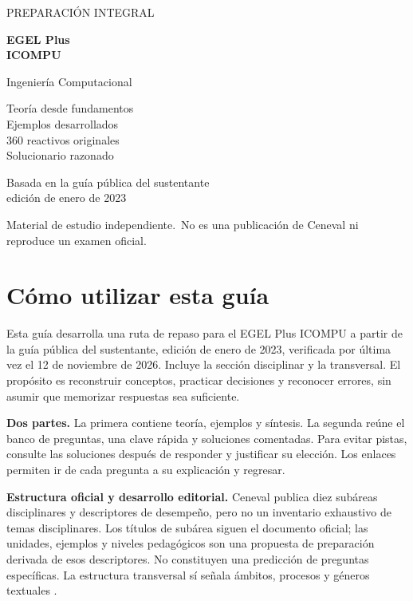 \documentclass[11pt,letterpaper,oneside]{book}
\begin{document}
\hypersetup{pageanchor=false}
\begin{titlepage}
\pagecolor{ink}\color{white}
\vspace*{1.5cm}
{\sffamily\Large PREPARACIÓN INTEGRAL}\par\vspace{1cm}
{\Huge\bfseries EGEL Plus\\[8pt] ICOMPU}\par\vspace{0.8cm}
{\LARGE Ingeniería Computacional}\par\vspace{1.2cm}
{\Large Teoría desde fundamentos\\Ejemplos desarrollados\\360 reactivos originales\\Solucionario razonado}\par
\vfill
{\large Basada en la guía pública del sustentante\\edición de enero de 2023}\par\vspace{0.7cm}
{\small Material de estudio independiente.\ No es una publicación de Ceneval ni reproduce un examen oficial.}\par
\vspace{0.4cm}{\small © 2026 @ivanblueberry · Contenido bajo CC BY-SA 4.0.}\par
\end{titlepage}\nopagecolor
\frontmatter
\hypersetup{pageanchor=true}
\chapter*{Cómo utilizar esta guía}
Esta guía desarrolla una ruta de repaso para el EGEL Plus ICOMPU a partir de la guía pública del sustentante, edición de enero de 2023, verificada por última vez el 12 de noviembre de 2026. Incluye la sección disciplinar y la transversal. El propósito es reconstruir conceptos, practicar decisiones y reconocer errores, sin asumir que memorizar respuestas sea suficiente.

\textbf{Dos partes.} La primera contiene teoría, ejemplos y síntesis. La segunda reúne el banco de preguntas, una clave rápida y soluciones comentadas. Para evitar pistas, consulte las soluciones después de responder y justificar su elección. Los enlaces permiten ir de cada pregunta a su explicación y regresar.

\textbf{Estructura oficial y desarrollo editorial.} Ceneval publica diez subáreas disciplinares y descriptores de desempeño, pero no un inventario exhaustivo de temas disciplinares. Los títulos de subárea siguen el documento oficial; las unidades, ejemplos y niveles pedagógicos son una propuesta de preparación derivada de esos descriptores. No constituyen una predicción de preguntas específicas. La estructura transversal sí señala ámbitos, procesos y géneros textuales \cite[págs. 10--23 y 29--31]{ceneval}.
\end{document}
